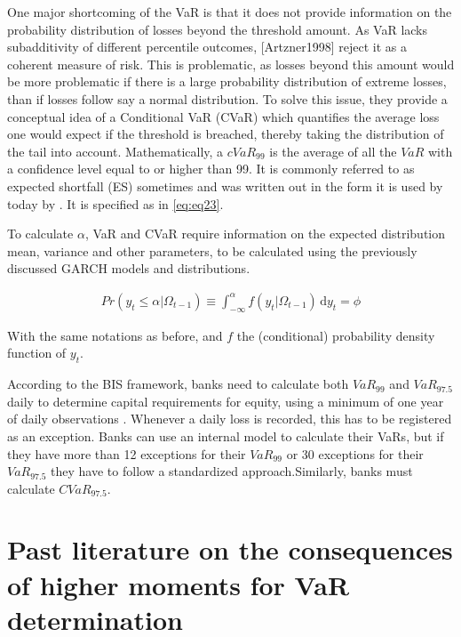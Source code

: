 \documentclass[a4paper, nobind]{templates/ociamthesis}
\begin{document}
One major shortcoming of the VaR is that it does not provide information on the probability distribution of losses beyond the threshold amount. As VaR lacks subadditivity of different percentile outcomes, {[}Artzner1998{]} reject it as a coherent measure of risk. This is problematic, as losses beyond this amount would be more problematic if there is a large probability distribution of extreme losses, than if losses follow say a normal distribution. To solve this issue, they provide a conceptual idea of a Conditional VaR (CVaR) which quantifies the average loss one would expect if the threshold is breached, thereby taking the distribution of the tail into account. Mathematically, a \(cVaR_{99}\) is the average of all the \(VaR\) with a confidence level equal to or higher than 99. It is commonly referred to as expected shortfall (ES) sometimes and was written out in the form it is used by today by \autocite{bertsimas2004}. It is specified as in \eqref{eq:eq23}.

To calculate \(\alpha\), VaR and CVaR require information on the expected distribution mean, variance and other parameters, to be calculated using the previously discussed GARCH models and distributions.

\begin{align}
Pr(y_t \le \alpha | \Omega_{t-1}) \equiv \int_{-\infty}^{\alpha} \! f(y_t | \Omega_{t-1}) \, \mathrm{d}y_t = \phi
 \label{eq:eq23}
\end{align}

With the same notations as before, and \(f\) the (conditional) probability density function of \(y_t\).

According to the BIS framework, banks need to calculate both \(VaR_{99}\) and \(VaR_{97.5}\) daily to determine capital requirements for equity, using a minimum of one year of daily observations \autocite{baselcommitteeonbankingsupervision2016}. Whenever a daily loss is recorded, this has to be registered as an exception. Banks can use an internal model to calculate their VaRs, but if they have more than 12 exceptions for their \(VaR_{99}\) or 30 exceptions for their \(VaR_{97.5}\) they have to follow a standardized approach.Similarly, banks must calculate \(CVaR_{97.5}\).

\hypertarget{past-lit}{%
\section{Past literature on the consequences of higher moments for VaR determination}\label{past-lit}}
\end{document}
